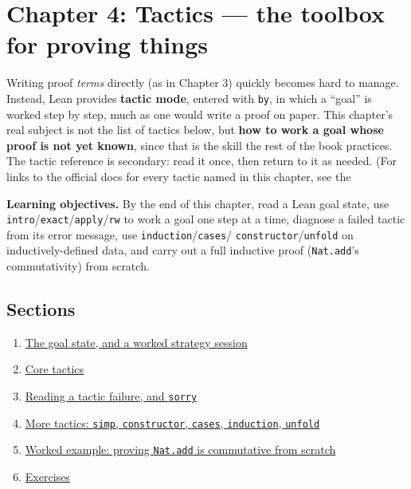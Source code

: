 \chapter{Chapter 4: Tactics --- the toolbox for proving things}\label{sec:04-tactics:00-index:1}

Writing proof \emph{terms} directly (as in Chapter 3) quickly becomes hard to manage. Instead, Lean provides \textbf{tactic mode}, entered with \texttt{by}, in which a ``goal'' is worked step by step, much as one would write a proof on paper. This chapter's real subject is not the list of tactics below, but \textbf{how to work a goal whose proof is not yet known}, since that is the skill the rest of the book practices. The tactic reference is secondary: read it once, then return to it as needed. (For links to the official docs for every tactic named in this chapter, see the

\textbf{Learning objectives.} By the end of this chapter, read a Lean goal state, use \texttt{intro}/\texttt{exact}/\texttt{apply}/\texttt{rw} to work a goal one step at a time, diagnose a failed tactic from its error message, use \texttt{induction}/\texttt{cases}/ \texttt{constructor}/\texttt{unfold} on inductively-defined data, and carry out a full inductive proof (\texttt{Nat.add}'s commutativity) from scratch.

\section{Sections}\label{sec:04-tactics:00-index:2}

\begin{enumerate}
\def\labelenumi{\arabic{enumi}.}
\tightlist
\item
  \hyperref[sec:04-tactics:01-goal-state:1]{The goal state, and a worked strategy session}
\item
  \hyperref[sec:04-tactics:02-core-tactics:1]{Core tactics}
\item
  \hyperref[sec:04-tactics:03-reading-failures:1]{Reading a tactic failure, and \texttt{sorry}}
\item
  \hyperref[sec:04-tactics:04-more-tactics:1]{More tactics: \texttt{simp}, \texttt{constructor}, \texttt{cases}, \texttt{induction}, \texttt{unfold}}
\item
  \hyperref[sec:04-tactics:05-worked-example:1]{Worked example: proving \texttt{Nat.add} is commutative from scratch}
\item
  \hyperref[sec:04-tactics:06-exercises:1]{Exercises}
\end{enumerate}







